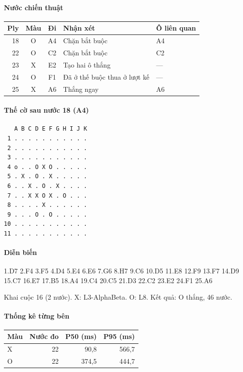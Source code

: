 \paragraph{Nước chiến thuật}
\begin{center}\small
\begin{tabular}{@{}rccll@{}}
\toprule
Ply & Màu & Đi & Nhận xét & Ô liên quan \\
\midrule
18 & O & A4 & Chặn bắt buộc & A4 \\
22 & O & C2 & Chặn bắt buộc & C2 \\
23 & X & E2 & Tạo hai ô thắng & — \\
24 & O & F1 & Đã ở thế buộc thua ở lượt kế & — \\
25 & X & A6 & Thắng ngay & A6 \\
\bottomrule
\end{tabular}
\end{center}
\paragraph{Thế cờ sau nước 18 (A4)}
\begin{verbatim}
   A B C D E F G H I J K
 1 . . . . . . . . . . .
 2 . . . . . . . . . . .
 3 . . . . . . . . . . .
 4 o . . O X O . . . . .
 5 . X . O . X . . . . .
 6 . . X . O . X . . . .
 7 . . X X O X . O . . .
 8 . . . . X . . . . . .
 9 . . . O . O . . . . .
10 . . . . . . . . . . .
11 . . . . . . . . . . .
\end{verbatim}
\paragraph{Diễn biến}
{\footnotesize 1.D7 2.F4 3.F5 4.D4 5.E4 6.E6 7.G6 8.H7 9.C6 10.D5 11.E8 12.F9 13.F7 14.D9 15.C7 16.E7 17.B5 18.A4 19.C4 20.C5 21.D3 22.C2 23.E2 24.F1 25.A6\par}
Khai cuộc 16 (2 nước). X: L3-AlphaBeta. O: L8. Kết quả: O thắng, 46 nước.
\paragraph{Thống kê từng bên}
\begin{center}\small
\begin{tabular}{@{}lrrr@{}}
\toprule
Màu & Nước đo & P50 (ms) & P95 (ms) \\
\midrule
X & 22 & 90,8 & 566,7 \\
O & 22 & 374,5 & 444,7 \\
\bottomrule
\end{tabular}
\end{center}
